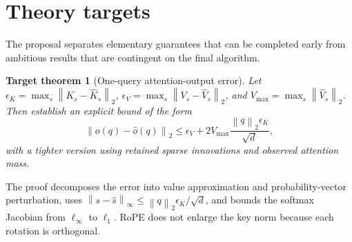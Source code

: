 \documentclass[11pt]{article}
\newtheorem{targettheorem}{Target theorem}
\newcommand{\norm}[1]{\left\lVert #1\right\rVert}
\begin{document}
\begin{center}
\end{center}

\section{Theory targets}
\label{sec:theory}

The proposal separates elementary guarantees that can be completed early from ambitious results
that are contingent on the final algorithm.

\begin{targettheorem}[One-query attention-output error]
\leavevmode\par\noindent
Let $\epsilon_K=\max_s\norm{K_s-\widehat K_s}_2$,
$\epsilon_V=\max_s\norm{V_s-\widehat V_s}_2$, and
$V_{\max}=\max_s\norm{\widehat V_s}_2$. Then establish an explicit bound of the form
\[
\norm{o(q)-\widehat o(q)}_2
\le \epsilon_V + 2V_{\max}\frac{\norm q_2\epsilon_K}{\sqrt d},
\]
with a tighter version using retained sparse innovations and observed attention mass.
\end{targettheorem}

The proof decomposes the error into value approximation and probability-vector perturbation, uses
$\norm{s-\widehat s}_\infty\le\norm q_2\epsilon_K/\sqrt d$, and bounds the softmax Jacobian from
$\ell_\infty$ to $\ell_1$. RoPE does not enlarge the key norm because each rotation is orthogonal.
\end{document}
